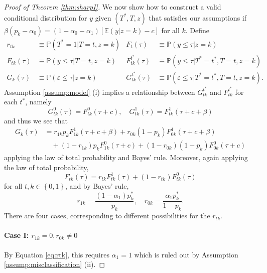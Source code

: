 \begin{proof}[Proof of Theorem \ref{thm:sharpI}]
We now show how to construct a valid conditional distribution for $y$ given $(T^*,T,z)$ that satisfies our assumptions if $\beta (p_k - \alpha_0) = (1 - \alpha_0 - \alpha_1)[\mathbb{E}(y|z=k) - c]$ for all $k$.
Define
\begin{align*}
r_{tk} &\equiv \mathbb{P}(T^*=1|T=t,z=k) &
F_{t}(\tau) &\equiv \mathbb{P}(y \leq \tau|z=k) \\
F_{tk}(\tau) &\equiv \mathbb{P}(y \leq \tau|T=t, z=k) & 
F_{tk}^{t^*}(\tau) &\equiv \mathbb{P}(y \leq \tau|T^*=t^*,T=t, z=k)\\
G_k(\tau) &\equiv \mathbb{P}(\varepsilon \leq \tau|z=k) &
G^{t^*}_{tk}(\tau) &\equiv \mathbb{P}(\varepsilon \leq \tau|T^*=t^*, T=t,z=k).
\end{align*}
Assumption \ref{assump:model} (i) implies a relationship between $G^{t^*}_{tk}$ and $F^{t^*}_{tk}$ for each $t^*$, namely 
\begin{equation}
  G^0_{tk}(\tau) = F^0_{tk}(\tau + c), \quad
  G^1_{tk}(\tau) = F^1_{tk}(\tau + c + \beta)
  \label{eq:Gtstartk}
\end{equation}
and thus we see that
\begin{align}
  G_k(\tau) &= r_{1k}p_k F^1_{1k}(\tau + c + \beta) + r_{0k}(1 - p_k) F^1_{0k}(\tau + c + \beta) \nonumber \\
  &\quad +  (1 - r_{1k})p_k F^0_{1k}(\tau + c) + (1 - r_{0k})(1 - p_k) F^0_{0k}(\tau + c)
  \label{eq:Gk}
\end{align}
applying the law of total probability and Bayes' rule.
Moreover, again applying the law of total probability, 
\begin{equation}
  F_{tk}(\tau) = r_{tk} F_{tk}^1(\tau) + (1 - r_{tk}) F_{tk}^0(\tau)
  \label{eq:Ftk}
\end{equation}
for all $t,k \in \left\{ 0,1 \right\}$, and by Bayes' rule,
\begin{equation}
  r_{1k} = \frac{(1 - \alpha_1)p_k^*}{p_k}, \quad
  r_{0k} = \frac{\alpha_1p_k^*}{1 - p_k}.
  \label{eq:rtk}
\end{equation}
There are four cases, corresponding to different possibilities for the  $r_{tk}$.

\paragraph{Case I: $r_{1k} = 0, r_{0k} \neq 0$}
By Equation \ref{eq:rtk}, this requires $\alpha_1 = 1$ which is ruled out by Assumption \ref{assump:misclassification} (ii).


\end{proof}
